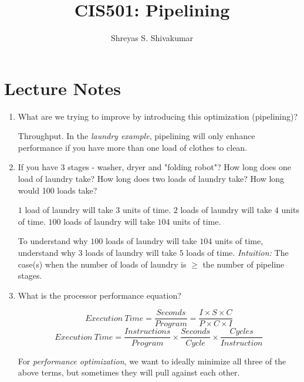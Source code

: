 \documentclass[12pt]{article}
\title{CIS501: Pipelining}
\author[1]{Shreyas S. Shivakumar}
\newenvironment{QandA}{\begin{enumerate}[label=\bfseries\arabic*.]\bfseries}
                      {\end{enumerate}}
\newenvironment{answered}{\par\quad\normalfont}{}
\begin{document}
\maketitle

\section{Lecture Notes}

\begin{QandA}
   \item What are we trying to improve by introducing this optimization (pipelining)?
        \begin{answered}
        Throughput. In the \textit{laundry example}, pipelining will only enhance performance if you have more than one load of clothes to clean.
        \end{answered}
        
    \item If you have 3 stages - washer, dryer and "folding robot"? How long does one load of laundry take? How long does two loads of laundry take? How long would 100 loads take?
        \begin{answered}
            $1$ load of laundry will take $3$ units of time. $2$ loads of laundry will take $4$ units of time. $100$ loads of laundry will take $104$ units of time. 
            
            To understand why $100$ loads of laundry will take $104$ units of time, understand why $3$ loads of laundry will take $5$ loads of time. \textit{Intuition:} The case(s) when the number of loads of laundry is $\geq$ the number of pipeline stages.
        \end{answered}
        
    \item What is the processor performance equation?
    \begin{answered}
    \begin{equation*}
        Execution\ Time = \frac{Seconds}{Program} = \frac{I \times S \times C}{P \times C \times I}
    \end{equation*}
    \begin{equation*}
        Execution\ Time = \frac{Instructions}{Program} \times \frac{Seconds}{Cycle} \times \frac{Cycles}{Instruction}
    \end{equation*}
    
    For \textit{performance optimization}, we want to ideally minimize all three of the above terms, but sometimes they will pull against each other.
    

\end{answered}
\end{QandA}
\end{document}
